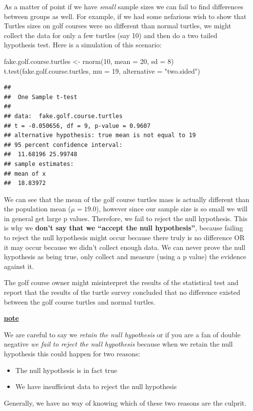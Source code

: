 \documentclass[
]{book}
\newenvironment{Shaded}{\begin{snugshade}}{\end{snugshade}}
\newcommand{\AttributeTok}[1]{\textcolor[rgb]{0.77,0.63,0.00}{#1}}
\newcommand{\DecValTok}[1]{\textcolor[rgb]{0.00,0.00,0.81}{#1}}
\newcommand{\FunctionTok}[1]{\textcolor[rgb]{0.00,0.00,0.00}{#1}}
\newcommand{\NormalTok}[1]{#1}
\newcommand{\OtherTok}[1]{\textcolor[rgb]{0.56,0.35,0.01}{#1}}
\newcommand{\StringTok}[1]{\textcolor[rgb]{0.31,0.60,0.02}{#1}}
\providecommand{\tightlist}{%
  \setlength{\itemsep}{0pt}\setlength{\parskip}{0pt}}
\newenvironment{rmdblock}[1]
  {\begin{shaded*}
  \centerline{\underline{\textbf{#1}}}

  }
  {
  \end{shaded*}
  }
\newenvironment{note}
  {\begin{rmdblock}{note}}
  {\end{rmdblock}}
\theoremstyle{definition}
\theoremstyle{definition}
\theoremstyle{definition}
\theoremstyle{definition}
\theoremstyle{remark}
\begin{document}
As a matter of point if we have \emph{small} sample sizes we can fail to find differences between groups as well. For example, if we had some nefarious wish to show that Turtles sizes on golf courses were no different than normal turtles, we might collect the data for only a few turtles (say 10) and then do a two tailed hypothesis test. Here is a simulation of this scenario:

\begin{Shaded}
\begin{Highlighting}[]
\NormalTok{fake.golf.course.turtles }\OtherTok{\textless{}{-}} \FunctionTok{rnorm}\NormalTok{(}\DecValTok{10}\NormalTok{, }\AttributeTok{mean =} \DecValTok{20}\NormalTok{, }\AttributeTok{sd =} \DecValTok{8}\NormalTok{)}
\FunctionTok{t.test}\NormalTok{(fake.golf.course.turtles, }\AttributeTok{mu =} \DecValTok{19}\NormalTok{, }\AttributeTok{alternative =} \StringTok{"two.sided"}\NormalTok{)}
\end{Highlighting}
\end{Shaded}

\begin{verbatim}
## 
##  One Sample t-test
## 
## data:  fake.golf.course.turtles
## t = -0.050656, df = 9, p-value = 0.9607
## alternative hypothesis: true mean is not equal to 19
## 95 percent confidence interval:
##  11.68196 25.99748
## sample estimates:
## mean of x 
##  18.83972
\end{verbatim}

We can see that the mean of the golf course turtles mass is actually different than the population mean (\(\mu=19.0\)), however since our sample size is so small we will in general get large p values. Therefore, we fail to reject the null hypothesis. This is why we \textbf{don't say that we ``accept the null hypothesis''}, because failing to reject the null hypothesis might occur because there truly is no difference OR it may occur because we didn't collect enough data. We can never prove the null hypothesis as being true, only collect and measure (using a p value) the evidence against it.

The golf course owner might misinterpret the results of the statistical test and report that the results of the turtle survey concluded that no difference existed between the golf course turtles and normal turtles.

\begin{note}
We are careful to say we \emph{retain the null hypothesis} or if you are a fan of double negative \emph{we fail to reject the null hypothesis} because when we retain the null hypothesis this could happen for two reasons:

\begin{itemize}
\tightlist
\item
  The null hypothesis is in fact true
\item
  We have insufficient data to reject the null hypothesis
\end{itemize}

Generally, we have no way of knowing which of these two reasons are the culprit.
\end{note}
\end{document}
